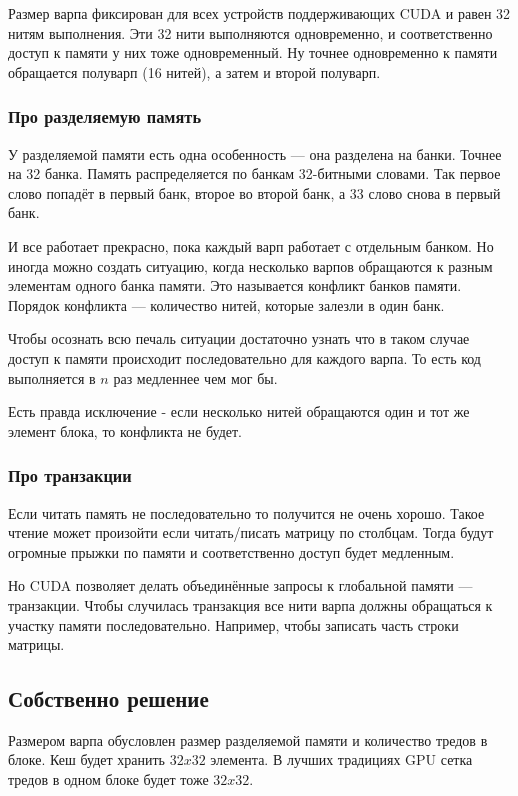 \documentclass[12pt]{article}
\begin{document}
Размер варпа фиксирован для всех устройств поддерживающих CUDA и равен 32 нитям выполнения.
Эти 32 нити выполняются одновременно, и соответственно доступ к памяти у них тоже одновременный.
Ну точнее одновременно к памяти обращается полуварп (16 нитей), а затем и второй полуварп.

\subsubsection*{Про разделяемую память}

У разделяемой памяти есть одна особенность --- она разделена на банки. Точнее на 32 банка.
Память распределяется по банкам 32-битными словами. Так первое слово попадёт в первый банк,
второе во второй банк, а 33 слово снова в первый банк.

И все работает прекрасно, пока каждый варп работает с отдельным банком.
Но иногда можно создать ситуацию, когда несколько варпов обращаются к разным элементам одного банка памяти.
Это называется конфликт банков памяти. Порядок конфликта --- количество нитей, которые залезли в один банк.

Чтобы осознать всю печаль ситуации достаточно узнать что в таком случае доступ к памяти происходит последовательно
для каждого варпа. То есть код выполняется в $n$ раз медленнее чем мог бы.

Есть правда исключение - если несколько нитей обращаются один и тот же элемент блока, то конфликта не будет.

\subsubsection*{Про транзакции}

Если читать память не последовательно то получится не очень хорошо.
Такое чтение может произойти если читать/писать матрицу по столбцам.
Тогда будут огромные прыжки по памяти и соответственно доступ будет медленным.

Но CUDA позволяет делать объединённые запросы к глобальной памяти --- транзакции.
Чтобы случилась транзакция все нити варпа должны обращаться к участку памяти последовательно.
Например, чтобы записать часть строки матрицы.

\subsection*{Собственно решение}

Размером варпа обусловлен размер разделяемой памяти и количество тредов в блоке.
Кеш будет хранить $32x32$ элемента.
В лучших традициях GPU сетка тредов в одном блоке будет тоже $32x32$.
\end{document}
